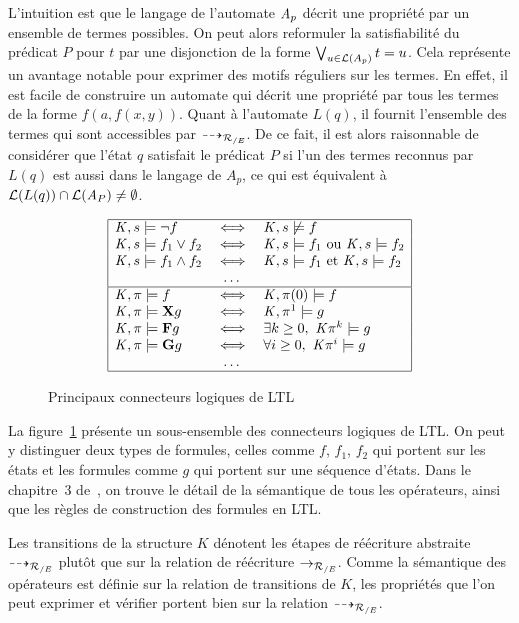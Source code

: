 L'intuition est que le langage de l'automate $\mathit A_p$ décrit une propriété par un ensemble de termes possibles.
On peut alors reformuler la satisfiabilité du prédicat $P$ pour $t$ par une disjonction de la forme 
$\bigvee_{u \in \mathcal{L}(A_p)} t = u$.
Cela représente un avantage notable pour exprimer des motifs réguliers sur les termes. En effet, il est facile 
de construire un automate qui décrit une propriété par tous les termes de la forme $f(a, f(x, y))$.
Quant à l'automate $L(q)$, il fournit l'ensemble des termes qui sont accessibles par $\dashrightarrow_{\mathcal R_{/E}}$.
De ce fait, il est alors raisonnable de considérer que l'état $q$ satisfait le prédicat $P$ si l'un des termes reconnus par $L(q)$ est aussi
dans le langage de $A_p$, ce qui est équivalent à $\mathcal{L}{}(L(q)) \cap \mathcal{L}{}(\mathit A_P) \neq \emptyset$.
\begin{figure}[ht!]
  \centering
  \[\begin{array}{|lcl|}
    \hline
    \mathit K, s \models \neg f & \; \Longleftrightarrow \; &  \mathit K, s \not\models f\\
    \mathit K, s \models f_1 \lor f_2 & \; \Longleftrightarrow \; & \mathit K, s \models f_1 \textrm{ ou } \mathit K, s \models f_2\\
    \mathit K, s \models f_1 \land f_2 & \; \Longleftrightarrow \; & \mathit K, s \models f_1 \textrm{ et } \mathit K, s \models f_2\\
    &\dots&\\
    \hline
    \mathit K, \pi \models f & \; \Longleftrightarrow \; & \mathit K, \pi(0) \models f\\
    \mathit K, \pi \models \mathbf X g & \; \Longleftrightarrow \; & \mathit K, \pi^1 \models g\\
    \mathit K, \pi \models \mathbf F g & \; \Longleftrightarrow \; & \exists k \ge 0,\ \mathit K \pi^k \models g \\
    \mathit K, \pi \models \mathbf G g & \; \Longleftrightarrow \; & \forall i \ge 0,\ \mathit K \pi^i \models g \\
    &\dots&\\
    \hline
  \end{array}\]
  \caption{Principaux connecteurs logiques de LTL}
  \label{fig:operateursLTL}
\end{figure}
La figure~\ref{fig:operateursLTL} présente un sous-ensemble des
connecteurs logiques de LTL. On peut y distinguer deux types de
formules, celles comme $f$, $f_1$, $f_2$ qui portent sur les états
et les formules comme $g$ qui portent sur une séquence d'états.  Dans le chapitre~3
de~\cite{MC-Book}, on trouve le détail de la sémantique de tous les
opérateurs, ainsi que les règles de construction des formules en LTL.


Les transitions de la structure $K$ dénotent les étapes de réécriture abstraite $\dashrightarrow_{{\mathcal R_{/E}}}$
plutôt que sur la relation de réécriture $\rightarrow_{\mathcal R_{/E}}$. Comme la sémantique des opérateurs est définie
sur la relation de transitions de $K$, les propriétés que l'on peut exprimer et vérifier portent bien
sur la relation $\dashrightarrow_{\mathcal R_{/E}}$.

